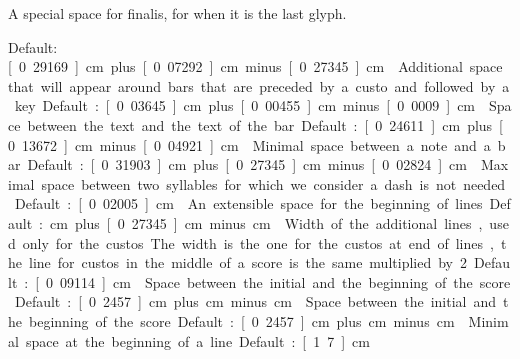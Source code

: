 A special space for finalis, for when it is the last glyph.  

Default: \unit[0.29169]{cm} plus \unit[0.07292]{cm} minus \unit[0.27345]{cm}

Additional space that will appear around bars that are preceded by a custo and followed by a key.  

Default: \unit[0.03645]{cm} plus \unit[0.00455]{cm} minus \unit[0.0009]{cm}

Space between the text and the text of the bar.  

Default: \unit[0.24611]{cm} plus \unit[0.13672]{cm} minus \unit[0.04921]{cm}

Minimal space between a note and a bar.  

Default: \unit[0.31903]{cm} plus \unit[0.27345]{cm} minus \unit[0.02824]{cm}

Maximal space between two syllables for which we consider a dash is not needed.  

Default: \unit[0.02005]{cm}

An extensible space for the beginning of lines.  

Default: \unit[0]{cm} plus \unit[0.27345]{cm} minus \unit[0]{cm}

Width of the additional lines, used only for the custos.  The width is the one for the custos at end of lines, the line for custos in the middle of a score is the same multiplied by 2.  

Default: \unit[0.09114]{cm}

Space between the initial and the beginning of the score.  

Default: \unit[0.2457]{cm} plus \unit[0]{cm} minus \unit[0]{cm}

Space between the initial and the beginning of the score.  

Default: \unit[0.2457]{cm} plus \unit[0]{cm} minus \unit[0]{cm}

Minimal space at the beginning of a line.

Default: \unit[1.7]{cm}

